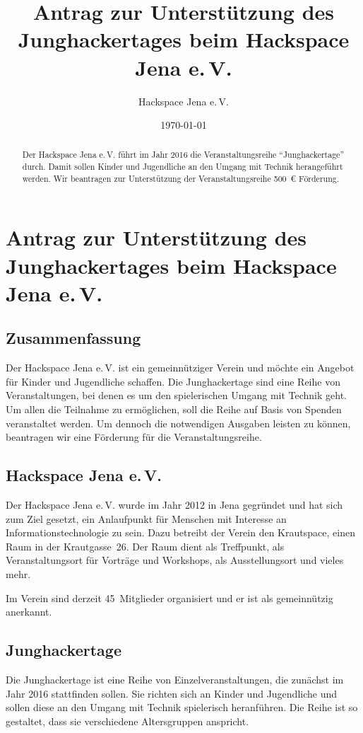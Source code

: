 \documentclass{scrartcl}
\title{Antrag zur Unterstützung des Junghackertages beim Hackspace Jena e.\,V.}
\author{Hackspace Jena e.\,V.}
\date{\today}
\begin{document}
\maketitle{}
\begin{abstract}
  Der Hackspace Jena e.\,V. führt im Jahr 2016 die Veranstaltungsreihe
  \enquote{Junghackertage} durch. Damit sollen Kinder und Jugendliche an den
  Umgang mit Technik herangeführt werden. Wir beantragen zur Unterstützung der
  Veranstaltungsreihe 500~\euro{} Förderung.
\end{abstract}



\section{Antrag zur Unterstützung des Junghackertages beim Hackspace Jena e.\,V.}
\label{sec:orgheadline5}
\subsection{Zusammenfassung}
\label{sec:orgheadline1}
Der Hackspace Jena e.\,V. ist ein gemeinnütziger Verein und möchte ein Angebot
für Kinder und Jugendliche schaffen. Die Junghackertage sind eine Reihe von
Veranstaltungen, bei denen es um den spielerischen Umgang mit Technik
geht. Um allen die Teilnahme zu ermöglichen, soll die Reihe auf Basis von
Spenden veranstaltet werden. Um dennoch die notwendigen Ausgaben leisten zu
können, beantragen wir eine Förderung für die Veranstaltungsreihe.
\subsection{Hackspace Jena e.\,V.}
\label{sec:orgheadline2}
Der Hackspace Jena e.\,V. wurde im Jahr 2012 in Jena gegründet und hat sich zum
Ziel gesetzt, ein Anlaufpunkt für Menschen mit Interesse an
Informationstechnologie zu sein. Dazu betreibt der Verein den Krautspace,
einen Raum in der Krautgasse~26. Der Raum dient als Treffpunkt, als
Veranstaltungsort für Vorträge und Workshops, als Ausstellungsort und vieles
mehr.

Im Verein sind derzeit 45~Mitglieder organisiert und er ist als
gemeinnützig anerkannt.

\subsection{Junghackertage}
\label{sec:orgheadline3}
Die Junghackertage ist eine Reihe von Einzelveranstaltungen, die zunächst im
Jahr 2016 stattfinden sollen. Sie richten sich an Kinder und Jugendliche und
sollen diese an den Umgang mit Technik spielerisch heranführen. Die Reihe ist
so gestaltet, dass sie verschiedene Altersgruppen anspricht.
\end{document}

